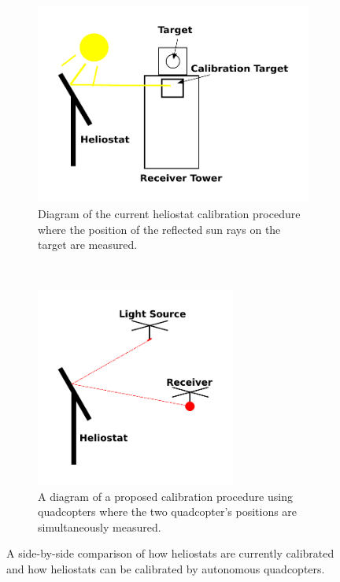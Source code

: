 \begin{figure}
  \centering
  \begin{subfigure}{0.49\textwidth}
    \centering
    \includegraphics[width=\textwidth]{figures/chapter1/cur_proc.pdf}
    \caption{Diagram of the current heliostat calibration procedure where the position of the reflected sun rays on the target are measured.}
\label{fig:cur-calib-proc}
  \end{subfigure}%
~
  \begin{subfigure}{0.49\textwidth}
    \centering
    \includegraphics[width=0.72\textwidth]{figures/chapter1/drone_proc.pdf}
    \caption{A diagram of a proposed calibration procedure using quadcopters where the two quadcopter's positions are simultaneously measured.}
\label{fig:drone-calib-proc}
  \end{subfigure}
  \caption{A side-by-side comparison of how heliostats are currently calibrated and how heliostats can be calibrated by autonomous quadcopters.}
\label{fig:calib-diagrams}
\end{figure}


